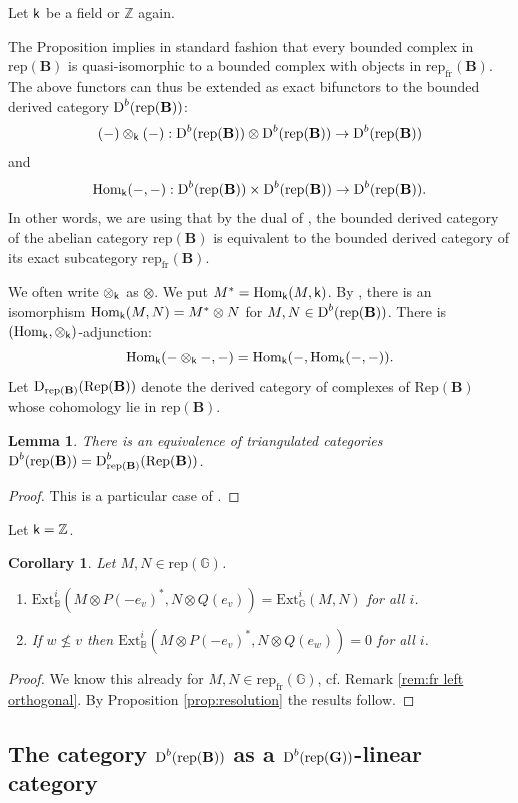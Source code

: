 \documentclass[sn-mathphys-num]{sn-jnl}%
\newcommand{\rep}{{\mathrm{rep}}}
\newcommand{\Ext}{{\mathrm{Ext}}}
\newcommand{\Rep}{{\mathrm{Rep}}}
\newcommand{\fr}{{\mathrm {fr}}}
\newcommand*{\Dd}{\mathop{\mathrm D\kern0pt}\nolimits}
\newcommand*{\Hom}{\mathop{\mathrm {Hom}}\nolimits}
\newcommand{\sk}{{\sf k}}
\newcommand{\Gm}{\mathbb G}
\newcommand{\Bm}{\mathbb B}
\newcommand{\Z}{{\mathbb Z}}
\newcommand{\bg}{\mathbf G}
\newcommand{\fb}{\mathbf B}
\newtheorem{corollary}[theorem]{Corollary}
\newtheorem{lemma}[theorem]{Lemma}
\theoremstyle{definition}
\begin{document}
Let $\sk$ be a field or $\Z$
again.

The Proposition implies in standard fashion that every
bounded complex in $\rep( \fb)$ is quasi-isomorphic to a bounded complex with objects in $\rep_\fr( \fb)$.
The above functors can thus be extended as exact bifunctors to the bounded derived category $\Dd ^b(\rep( \fb))$: 
$$
(-)\otimes_\sk (-): \Dd ^b(\rep( \fb))\otimes \Dd ^{b}(\rep( \fb))\rightarrow \Dd ^b(\rep( \fb))
$$
and 
$$\Hom_\sk(-,-):\Dd ^b(\rep( \fb))\times \Dd ^b(\rep( \fb))\to \Dd ^b(\rep( \fb)).$$ 
In other words, we are using that by the dual of \cite[Theorem 10.22, Remark 10.23]{Buehler},
 the bounded derived category of the abelian category $\rep(\fb)$ is equivalent to the bounded 
derived category of its exact subcategory $\rep_\fr(\fb)$.

We often write $\otimes_\sk $ as $\otimes$. We put $M^*=\Hom_\sk(M,\sk)$.
By \cite[I, Section 2.7, (5)]{Jan}, there is an isomorphism $\Hom _\sk(M, N)=M^{\ast}\otimes N$ for $M,N\in \Dd ^b(\rep( \fb))$. There is $(\Hom _\sk,\otimes _\sk)$-adjunction:
$$
\Hom _\sk (-\otimes _\sk-,-)=\Hom _\sk (-,\Hom _\sk(-,-)).
$$
Let $\Dd_{\rep ({\fb})}(\Rep(\fb))$ denote the derived category of complexes of $\Rep(\fb)$ whose cohomology lie in $\rep ({\fb})$.
\begin{lemma}
There is an equivalence of triangulated categories $\Dd^b (\rep ({\fb}))=\Dd ^b_{\rep ({\fb})}(\Rep(\fb))$. 
\end{lemma}

\begin{proof}
This is a particular case of \cite[Appendix, Lemma A.3]{MR}.
\end{proof}

Let $\sk=\Z$.
\begin{corollary}\label{cor:Z left orthogonal}
Let $M, N\in \rep(\Gm)$.
\begin{enumerate}
\item $\Ext^i_ \Bm (M\otimes P(-e_v)^*,N\otimes Q(e_v))=\Ext^i_ \Gm (M,N) $ for all $i$.
\item If $w\not\leq v$ then $\Ext^i_ \Bm (M\otimes P(-e_v)^*,N\otimes Q(e_w))=0$ for all $i$.
\end{enumerate}
\end{corollary}
\begin{proof}We know this already for $M, N\in \rep_\fr(\Gm)$, cf. Remark \ref{rem:fr left orthogonal}.
By Proposition \ref{prop:resolution} the results follow.
\end{proof}
\subsection{The category $\Dd^b (\rep ({\fb}))$ as a $\Dd^b (\rep ( \bg))$-linear category}
\label{subsec:G-linear-triang_cat}
\end{document}
